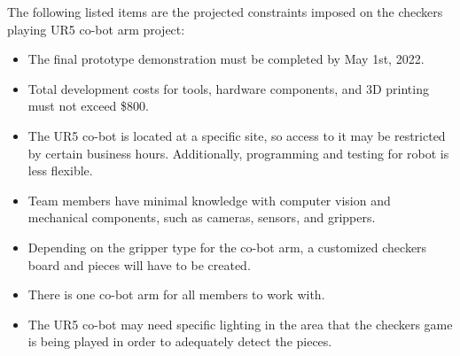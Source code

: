 The following listed items are the projected constraints imposed on the checkers playing UR5 co-bot arm project:

\begin{itemize}
    \item The final prototype demonstration must be completed by May 1st, 2022.
    \item Total development costs for tools, hardware components, and 3D printing must not exceed \$800.
    \item The UR5 co-bot is located at a specific site, so access to it may be restricted by certain business hours. Additionally, programming and testing for robot is less flexible.
    \item Team members have minimal knowledge with computer vision and mechanical components, such as cameras, sensors, and grippers.
    \item Depending on the gripper type for the co-bot arm, a customized checkers board and pieces will have to be created.
    \item There is one co-bot arm for all members to work with.
    \item The UR5 co-bot may need specific lighting in the area that the checkers game is being played in order to adequately detect the pieces. 
    
\end{itemize}

\iffalse
Constraints are limitations imposed on the project, such as the limitation of cost, schedule, or resources, and you have to work within the boundaries restricted by these constraints. All projects have constraints, which are defined and identified at the beginning of the project.

Constraints are outside of your control. They are imposed upon you by your client, organization, government regulations, availability of resources, etc. Occasionally, identified constraints turn out to be false. This is often beneficial to the development team, since it removes items that could potentially affect progress.

This section should contain a list of at least 5 of the most critical constraints related to your project. For example:

The following list contains key constraints related to the implementation and testing of the project.

\begin{itemize}
  \item Final prototype demonstration must be completed by May 1st, 20XX
  \item The customer will provide no more than two maintenance personnel to assist in on-site installation
  \item Customer installation site will only be accessible by development team during normal business hours
  \item Total development costs must not exceed \$800
  \item All data obtained from customer site must be reviewed and approved for release by the Information Security Office prior to being copied to any internet connected storage medium
\end{itemize}
\fi